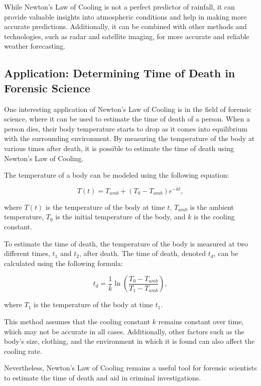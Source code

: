 \documentclass[12pt, a4paper]{article}
\begin{document}
While Newton's Law of Cooling is not a perfect predictor of rainfall, it can provide valuable insights into atmospheric conditions and help in making more accurate predictions. Additionally, it can be combined with other methods and technologies, such as radar and satellite imaging, for more accurate and reliable weather forecasting.

\subsection{Application: Determining Time of Death in Forensic Science}

One interesting application of Newton's Law of Cooling is in the field of forensic science, where it can be used to estimate the time of death of a person. When a person dies, their body temperature starts to drop as it comes into equilibrium with the surrounding environment. By measuring the temperature of the body at various times after death, it is possible to estimate the time of death using Newton's Law of Cooling.

The temperature of a body can be modeled using the following equation:

\begin{equation}
T(t) = T_{amb} + (T_0 - T_{amb}) e^{-kt},
\end{equation}

where $T(t)$ is the temperature of the body at time $t$, $T_{amb}$ is the ambient temperature, $T_0$ is the initial temperature of the body, and $k$ is the cooling constant.

To estimate the time of death, the temperature of the body is measured at two different times, $t_1$ and $t_2$, after death. The time of death, denoted $t_d$, can be calculated using the following formula:

\begin{equation}
t_d = \frac{1}{k} \ln \left(\frac{T_0 - T_{amb}}{T_1 - T_{amb}}\right),
\end{equation}

where $T_1$ is the temperature of the body at time $t_1$.

This method assumes that the cooling constant $k$ remains constant over time, which may not be accurate in all cases. Additionally, other factors such as the body's size, clothing, and the environment in which it is found can also affect the cooling rate.

Nevertheless, Newton's Law of Cooling remains a useful tool for forensic scientists to estimate the time of death and aid in criminal investigations.
\end{document}
